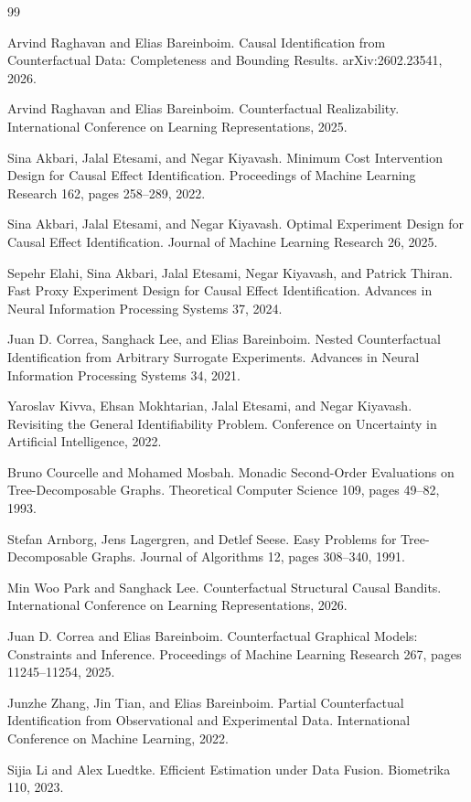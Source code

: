 \documentclass{article}
\begin{document}
\begin{thebibliography}{99}

   Arvind Raghavan and Elias Bareinboim. Causal Identification from Counterfactual Data: Completeness and Bounding Results. arXiv:2602.23541, 2026.

   Arvind Raghavan and Elias Bareinboim. Counterfactual Realizability. International Conference on Learning Representations, 2025.

   Sina Akbari, Jalal Etesami, and Negar Kiyavash. Minimum Cost Intervention Design for Causal Effect Identification. Proceedings of Machine Learning Research 162, pages 258--289, 2022.

   Sina Akbari, Jalal Etesami, and Negar Kiyavash. Optimal Experiment Design for Causal Effect Identification. Journal of Machine Learning Research 26, 2025.

   Sepehr Elahi, Sina Akbari, Jalal Etesami, Negar Kiyavash, and Patrick Thiran. Fast Proxy Experiment Design for Causal Effect Identification. Advances in Neural Information Processing Systems 37, 2024.

   Juan D. Correa, Sanghack Lee, and Elias Bareinboim. Nested Counterfactual Identification from Arbitrary Surrogate Experiments. Advances in Neural Information Processing Systems 34, 2021.

   Yaroslav Kivva, Ehsan Mokhtarian, Jalal Etesami, and Negar Kiyavash. Revisiting the General Identifiability Problem. Conference on Uncertainty in Artificial Intelligence, 2022.

   Bruno Courcelle and Mohamed Mosbah. Monadic Second-Order Evaluations on Tree-Decomposable Graphs. Theoretical Computer Science 109, pages 49--82, 1993.

   Stefan Arnborg, Jens Lagergren, and Detlef Seese. Easy Problems for Tree-Decomposable Graphs. Journal of Algorithms 12, pages 308--340, 1991.

   Min Woo Park and Sanghack Lee. Counterfactual Structural Causal Bandits. International Conference on Learning Representations, 2026.

   Juan D. Correa and Elias Bareinboim. Counterfactual Graphical Models: Constraints and Inference. Proceedings of Machine Learning Research 267, pages 11245--11254, 2025.

   Junzhe Zhang, Jin Tian, and Elias Bareinboim. Partial Counterfactual Identification from Observational and Experimental Data. International Conference on Machine Learning, 2022.

   Sijia Li and Alex Luedtke. Efficient Estimation under Data Fusion. Biometrika 110, 2023.

\end{thebibliography}
\end{document}

